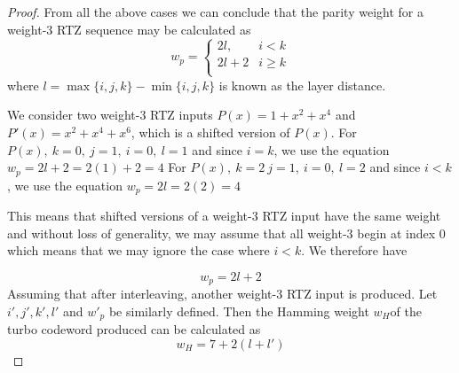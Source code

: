 \documentclass[11pt, oneside, dvipdfmx]{book}
\begin{document}
\begin{proof}
From all the above cases we can conclude that the parity weight for a weight-$3$ RTZ sequence may be calculated as
\begin{equation}
w_p=
\begin{cases}
2l,& i<k \\
2l+2 & i \geq k\\
\end{cases}
\end{equation}
where $l=\max \{ i,j,k \} - \min \{ i,j,k \}$ is known as the layer distance.

We consider two weight-3 RTZ inputs $P(x)=1+x^2+x^4$ and $P'(x)=x^2+x^4+x^6$, which is a shifted version of $P(x)$. 
For $P(x),~k=0,~j=1,~i=0,~l=1$ and since $i=k$, we use the equation $w_p=2l+2=2(1)+2=4$
For $P(x),~k=2~j=1,~i=0,~l=2$ and since $i<k$, we use the equation $w_p=2l=2(2)=4$

This means that shifted versions of a weight-$3$ RTZ input have the same weight and without loss of generality, we may assume that all weight-$3$ begin at index 0 which means that we may ignore the case where $i<k$. We therefore have

\begin{equation}w_p=2l+2\end{equation}
Assuming that after interleaving, another weight-$3$ RTZ input is produced. Let $i',j',k',l'$ and $w'_p$ be similarly defined. Then the Hamming weight $w_H$of the turbo codeword produced can be calculated as
\begin{equation}
w_H=
7+2(l+l') 
\end{equation}

\end{proof}
\newpage
\end{document}
